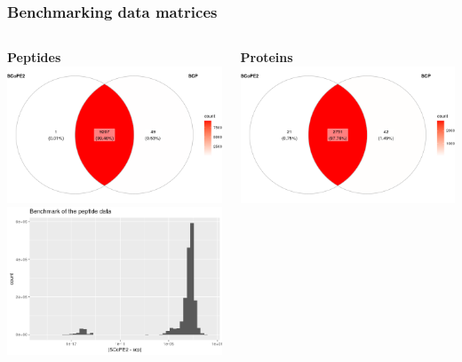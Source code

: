 \documentclass{beamer}
\newcommand{\frametitlesection}[1]{\frametitle{\centering #1 \footnotesize \hspace{0pt plus 1 filll} \insertsection}}
\begin{document}
\begin{frame}
    \frametitlesection{Benchmarking data matrices}
    \begin{columns}
        \begin{column}{0.5\textwidth}
            \textbf{Peptides} \\
            \includegraphics[width=\linewidth]{figs/Benchmark_pep_venn.png} \\
            \includegraphics[width=\linewidth]{figs/Benchmark_pep_err.png}
        \end{column}
        \begin{column}{0.5\textwidth}
            \textbf{Proteins} \\
            \includegraphics[width=\linewidth]{figs/Benchmark_prot_venn.png} \\

\end{column}
\end{columns}
\end{frame}
\end{document}
